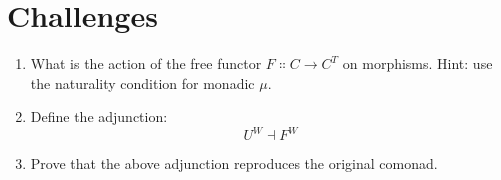 \section{Challenges}

\begin{enumerate}
  \tightlist
  \item
        What is the action of the free functor
        $F \Colon C \to C^T$ on morphisms. Hint: use the
        naturality condition for monadic $\mu$.
  \item
        Define the adjunction:
        \[U^W \dashv F^W\]
  \item
        Prove that the above adjunction reproduces the original comonad.
\end{enumerate}
